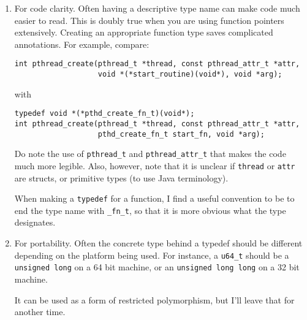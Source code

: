 \documentclass[11pt,onecolumn]{article}
\begin{document}
\begin{enumerate}[itemsep=0pt,topsep=1pt,parsep=1pt,leftmargin=2.5em]
\item For code clarity.  Often having a descriptive type name can make
  code much easier to read.  This is doubly true when you are using
  function pointers extensively.  Creating an appropriate function
  type saves complicated annotations.  For example, compare:

    \begin{minipage}{3in}
      \footnotesize
      \lstset{language=C}
      \begin{lstlisting}
int pthread_create(pthread_t *thread, const pthread_attr_t *attr,
                   void *(*start_routine)(void*), void *arg);
      \end{lstlisting}
    \end{minipage}

    with

    \begin{minipage}{3in}
      \footnotesize
      \lstset{language=C}
      \begin{lstlisting}
typedef void *(*pthd_create_fn_t)(void*);
int pthread_create(pthread_t *thread, const pthread_attr_t *attr,
                   pthd_create_fn_t start_fn, void *arg);
      \end{lstlisting}
    \end{minipage}

    Do note the use of {\tt pthread\_t} and {\tt pthread\_attr\_t} that
    makes the code much more legible.  Also, however, note that it is
    unclear if {\tt thread} or {\tt attr} are structs, or primitive
    types (to use Java terminology).

    When making a {\tt typedef} for a function, I find a useful
    convention to be to end the type name with {\tt \_fn\_t}, so that
    it is more obvious what the type designates.
  \item For portability.  Often the concrete type behind a typedef
    should be different depending on the platform being used.  For
    instance, a {\tt u64\_t} should be a {\tt unsigned long} on a 64
    bit machine, or an {\tt unsigned long long} on a 32 bit machine.

    It can be used as a form of restricted polymorphism, but I'll
    leave that for another time.
\end{enumerate}

\end{document}
